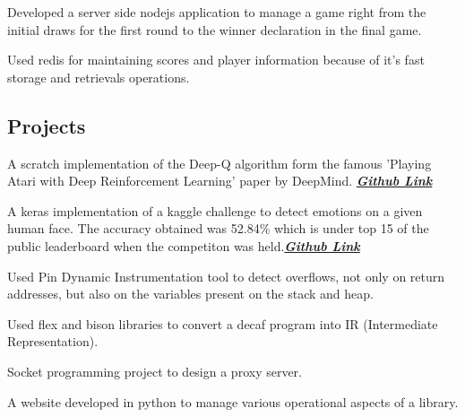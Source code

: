 \documentclass[letterpaper]{deedy-resume} %
\begin{document}
\begin{minipage}[t]{0.66\textwidth}


\begin{tightitemize}
\item Developed a server side nodejs application to manage a game right from the initial draws for the first round to the winner declaration in the final game.
\item Used redis for maintaining scores and player information because of it's fast storage and retrievals operations.
\end{tightitemize}

\sectionspace %

\vspace{\topsep} %
\subsection{Projects}
\vspace{\topsep} %
\begin{tightitemize}
\item {} A scratch implementation of the Deep-Q algorithm form the famous 'Playing Atari with Deep Reinforcement Learning' paper by DeepMind. {\footnotesize \textit{\textbf{\href{https://github.com/jayanthkaturi/deepRL_agent}{Github Link} }}}
\item {} A keras implementation of a kaggle challenge to detect emotions on a given human face. The accuracy obtained was 52.84\% which is under top 15 of the public leaderboard when the competiton was held.{\footnotesize \textit{\textbf{\href{https://github.com/jayanthkaturi/emotion_detection}{Github Link} }}}
\item {} Used Pin Dynamic Instrumentation tool to detect overflows, not only on return addresses, but also on the variables present on the stack and heap.
\item {} Used flex and bison libraries to
convert a decaf program into IR (Intermediate Representation).
\item {} Socket programming project to design a proxy server.
\item {} A website developed in python to manage various operational aspects of a library.
\end{tightitemize}

\sectionspace %


\end{minipage} %
\end{document}
